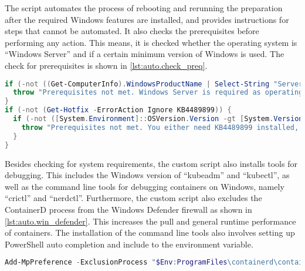 The script automates the process of rebooting and rerunning the preparation after the required \ac{Windows} features are installed, and provides instructions for steps that cannot be automated. It also checks the prerequisites before performing any action. This means, it is checked whether the operating system is \enquote{\ac{Windows} Server} and if a certain minimum version of \ac{Windows} is used. The check for prerequisites is shown in \autoref{lst:auto.check_preq}.
\begin{lstlisting}[label=lst:auto.check_preq, caption={Powershell commands in the automated setup script. Checks for prerequisites.}, language=PowerShell]
if (-not ((Get-ComputerInfo).WindowsProductName | Select-String "Server")) {
  throw "Prerequisites not met. Windows Server is required as operating system."
}
if (-not (Get-Hotfix -ErrorAction Ignore KB4489899)) {
  if (-not ([System.Environment]::OSVersion.Version -gt [System.Version]"10.0.17763.0")) {
    throw "Prerequisites not met. You either need KB4489899 installed, or a Windows Version higher than 10.0.17763"
  }
}
\end{lstlisting}

Besides checking for system requirements, the custom script also installs tools for debugging. This includes the \ac{Windows} version of \enquote{kubeadm} and \enquote{kubectl}, as well as the command line tools for debugging containers on \ac{Windows}, namely \enquote{crictl} and \enquote{nerdctl}.
Furthermore, the custom script also excludes the ContainerD process from the \ac{Windows} Defender firewall as shown in \autoref{lst:auto.win_defender}. This increases the pull and general runtime performance of containers.
The installation of the command line tools also involves setting up PowerShell auto completion and include to the  environment variable.
\begin{lstlisting}[label=lst:auto.win_defender, caption={Powershell command in the automated setup script. Exclusion of all actions performed by containerd.exe from Windows Defender.}, language=PowerShell, numbers=none]
Add-MpPreference -ExclusionProcess "$Env:ProgramFiles\containerd\containerd.exe"
\end{lstlisting}


